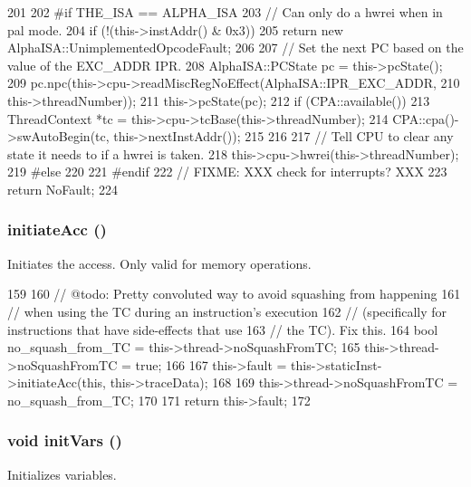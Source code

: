 \begin{DoxyCode}
201 {
202 #if THE_ISA == ALPHA_ISA
203     // Can only do a hwrei when in pal mode.
204     if (!(this->instAddr() & 0x3))
205         return new AlphaISA::UnimplementedOpcodeFault;
206 
207     // Set the next PC based on the value of the EXC_ADDR IPR.
208     AlphaISA::PCState pc = this->pcState();
209     pc.npc(this->cpu->readMiscRegNoEffect(AlphaISA::IPR_EXC_ADDR,
210                                           this->threadNumber));
211     this->pcState(pc);
212     if (CPA::available()) {
213         ThreadContext *tc = this->cpu->tcBase(this->threadNumber);
214         CPA::cpa()->swAutoBegin(tc, this->nextInstAddr());
215     }
216 
217     // Tell CPU to clear any state it needs to if a hwrei is taken.
218     this->cpu->hwrei(this->threadNumber);
219 #else
220 
221 #endif
222     // FIXME: XXX check for interrupts? XXX
223     return NoFault;
224 }
\end{DoxyCode}
\hypertarget{classBaseO3DynInst_af8310f8618e710a06b0c2cbface6ac72}{
\subsubsection[{initiateAcc}]{ initiateAcc ()}}
\label{classBaseO3DynInst_af8310f8618e710a06b0c2cbface6ac72}
Initiates the access. Only valid for memory operations. 


\begin{DoxyCode}
159 {
160     // @todo: Pretty convoluted way to avoid squashing from happening
161     // when using the TC during an instruction's execution
162     // (specifically for instructions that have side-effects that use
163     // the TC).  Fix this.
164     bool no_squash_from_TC = this->thread->noSquashFromTC;
165     this->thread->noSquashFromTC = true;
166 
167     this->fault = this->staticInst->initiateAcc(this, this->traceData);
168 
169     this->thread->noSquashFromTC = no_squash_from_TC;
170 
171     return this->fault;
172 }
\end{DoxyCode}
\hypertarget{classBaseO3DynInst_a1b19937d8cca25bf52a51ae7de67ea94}{
\subsubsection[{initVars}]{\setlength{\rightskip}{0pt plus 5cm}void initVars ()}}
\label{classBaseO3DynInst_a1b19937d8cca25bf52a51ae7de67ea94}
Initializes variables. 

